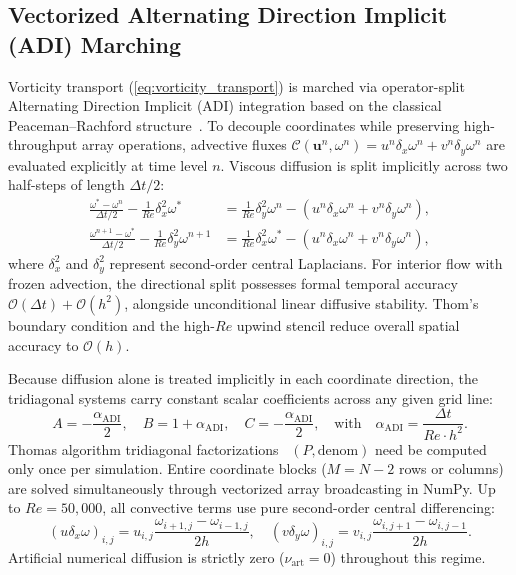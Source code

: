 \documentclass[11pt,a4paper]{article}
\begin{document}
\subsection{Vectorized Alternating Direction Implicit (ADI) Marching}
Vorticity transport (\ref{eq:vorticity_transport}) is marched via operator-split Alternating Direction Implicit (ADI) integration based on the classical Peaceman--Rachford structure~\cite{peaceman1955numerical}. To decouple coordinates while preserving high-throughput array operations, advective fluxes $\mathcal{C}(\mathbf{u}^n, \omega^n) = u^n \delta_x \omega^n + v^n \delta_y \omega^n$ are evaluated explicitly at time level $n$. Viscous diffusion is split implicitly across two half-steps of length $\Delta t / 2$:
\begin{align}
    \frac{\omega^* - \omega^n}{\Delta t / 2} - \frac{1}{Re}\delta_x^2 \omega^* &= \frac{1}{Re}\delta_y^2 \omega^n - \left( u^n \delta_x \omega^n + v^n \delta_y \omega^n \right), \label{eq:adi_step1} \\
    \frac{\omega^{n+1} - \omega^*}{\Delta t / 2} - \frac{1}{Re}\delta_y^2 \omega^{n+1} &= \frac{1}{Re}\delta_x^2 \omega^* - \left( u^n \delta_x \omega^n + v^n \delta_y \omega^n \right), \label{eq:adi_step2}
\end{align}
where $\delta_x^2$ and $\delta_y^2$ represent second-order central Laplacians. For interior flow with frozen advection, the directional split possesses formal temporal accuracy $\mathcal{O}(\Delta t) + \mathcal{O}(h^2)$, alongside unconditional linear diffusive stability. Thom's boundary condition and the high-$Re$ upwind stencil reduce overall spatial accuracy to $\mathcal{O}(h)$.

Because diffusion alone is treated implicitly in each coordinate direction, the tridiagonal systems carry constant scalar coefficients across any given grid line:
\begin{equation}
    A = -\frac{\alpha_{\text{ADI}}}{2}, \quad B = 1 + \alpha_{\text{ADI}}, \quad C = -\frac{\alpha_{\text{ADI}}}{2}, \quad \text{with} \quad \alpha_{\text{ADI}} = \frac{\Delta t}{Re \cdot h^2}.
\end{equation}
Thomas algorithm tridiagonal factorizations~\cite{thomas1949elliptic} $(P, \text{denom})$ need be computed only once per simulation. Entire coordinate blocks ($M = N-2$ rows or columns) are solved simultaneously through vectorized array broadcasting in NumPy. Up to $Re = 50{,}000$, all convective terms use pure second-order central differencing:
\begin{equation}
    (u \delta_x \omega)_{i, j} = u_{i, j} \frac{\omega_{i+1, j} - \omega_{i-1, j}}{2 h}, \quad (v \delta_y \omega)_{i, j} = v_{i, j} \frac{\omega_{i, j+1} - \omega_{i, j-1}}{2 h}.
\end{equation}
Artificial numerical diffusion is strictly zero ($\nu_{\text{art}} = 0$) throughout this regime.
\end{document}
